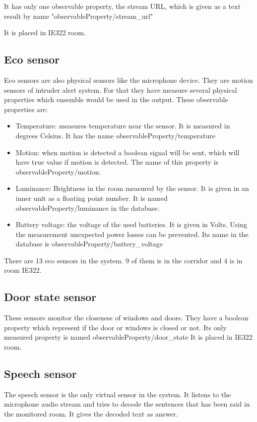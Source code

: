  It has only one observable property, the stream URL, which is given as a text result by name "observableProperty/stream\_url"
 
 It is placed in IE322 room.
 
 \subsection*{Eco sensor}
 Eco sensors are also physical sensors like the microphone device. They are motion sensors of intruder alert system. For that they have measure several physical properties which ensemble would be used in the output. These observable properties are:
 \begin{itemize}
 \item Temperature: measures temperature near the sensor. It is measured in degrees Celsius. It has the name observableProperty/temperature
 \item Motion: when motion is detected a boolean signal will be sent, which will have true value if motion is detected. The name of this property is observableProperty/motion.
 \item Luminance: Brightness in the room measured by the sensor. It is given in an inner unit as a floating point number. It is named observableProperty/luminance in the database.
 \item Battery voltage: the voltage of the used batteries. It is given in Volts. Using the measurement unexpected power losses can be prevented. Its name in the database is observableProperty/battery\_voltage
 \end{itemize}
 There are 13 eco sensors in the system. 9 of them is in the corridor and 4 is in room IE322.  
 
 \subsection*{Door state sensor}
 These sensors monitor the closeness of windows and doors. They have a boolean property which represent if the door or windows is closed or not. Its only measured property is named observableProperty/door\_state
 It is placed in IE322 room.
 
\subsection*{Speech sensor}

The speech sensor is the only virtual sensor in the system. It listens to the microphone audio stream and tries to decode the sentences that has been said in the monitored room. It gives the decoded text as answer.


